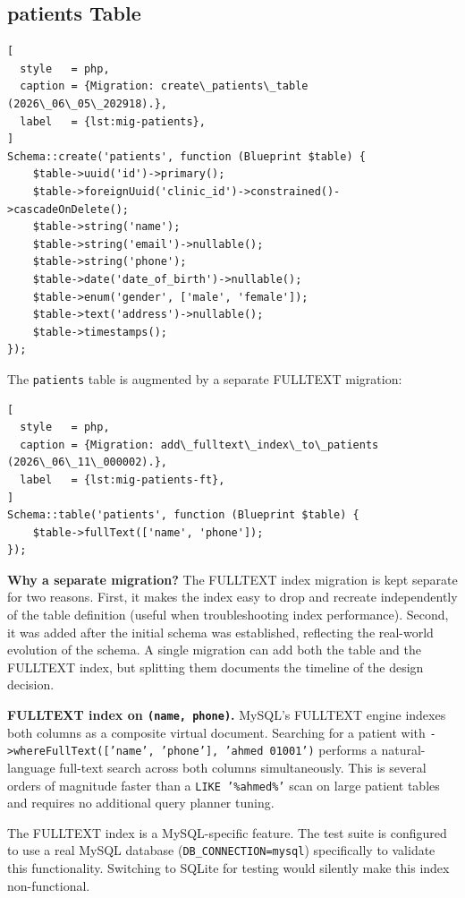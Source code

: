 \subsection{patients Table}

\begin{lstlisting}[
  style   = php,
  caption = {Migration: create\_patients\_table (2026\_06\_05\_202918).},
  label   = {lst:mig-patients},
]
Schema::create('patients', function (Blueprint $table) {
    $table->uuid('id')->primary();
    $table->foreignUuid('clinic_id')->constrained()->cascadeOnDelete();
    $table->string('name');
    $table->string('email')->nullable();
    $table->string('phone');
    $table->date('date_of_birth')->nullable();
    $table->enum('gender', ['male', 'female']);
    $table->text('address')->nullable();
    $table->timestamps();
});
\end{lstlisting}

The \texttt{patients} table is augmented by a separate FULLTEXT migration:

\begin{lstlisting}[
  style   = php,
  caption = {Migration: add\_fulltext\_index\_to\_patients (2026\_06\_11\_000002).},
  label   = {lst:mig-patients-ft},
]
Schema::table('patients', function (Blueprint $table) {
    $table->fullText(['name', 'phone']);
});
\end{lstlisting}

\textbf{Why a separate migration?} The FULLTEXT index migration is kept
separate for two reasons. First, it makes the index easy to drop and
recreate independently of the table definition (useful when
troubleshooting index performance). Second, it was added after the
initial schema was established, reflecting the real-world evolution of
the schema. A single migration can add both the table and the FULLTEXT
index, but splitting them documents the timeline of the design decision.

\textbf{FULLTEXT index on \texttt{(name, phone)}.} MySQL's FULLTEXT
engine indexes both columns as a composite virtual document. Searching
for a patient with
\texttt{->whereFullText(['name', 'phone'], 'ahmed 01001')} performs a
natural-language full-text search across both columns simultaneously.
This is several orders of magnitude faster than a
\texttt{LIKE '\%ahmed\%'} scan on large patient tables and requires
no additional query planner tuning.

\begin{importantbox}
  The FULLTEXT index is a MySQL-specific feature. The test suite is
  configured to use a real MySQL database (\texttt{DB\_CONNECTION=mysql})
  specifically to validate this functionality. Switching to SQLite for
  testing would silently make this index non-functional.
\end{importantbox}

